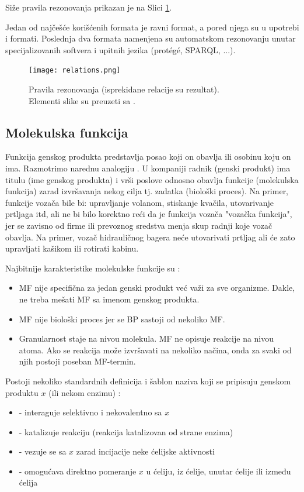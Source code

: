 Siže pravila rezonovanja prikazan je na Slici \ref{fig:relations}.

Jedan od najčešće korišćenih formata je  ravni  format, a pored njega
su u upotrebi  i  formati.  Poslednja dva formata
namenjena su automatskom rezonovanju unutar specijalizovanih softvera i upitnih
jezika (protégé, SPARQL, ...).

\begin{figure}[h!]
  \centering
  \texttt{[image: relations.png]}
  \caption{Pravila rezonovanja (isprekidane relacije su rezultat). \\ Elementi slike su preuzeti sa \parencite{go_veb}.}
  \label{fig:relations}
\end{figure}


\subsection{Molekulska funkcija}
\label{MF}

Funkcija genskog produkta predstavlja posao koji on obavlja ili osobinu koju on ima.
Razmotrimo narednu analogiju \parencite{go_mf}.  U kompaniji radnik (genski produkt) ima titulu
(ime genskog produkta) i vrši poslove odnosno obavlja funkcije (molekulska
funkcija) zarad izvršavanja nekog cilja tj. zadatka (biološki proces). Na
primer, funkcije vozača bile bi: upravljanje volanom, stiskanje kvačila,
utovarivanje prtljaga itd, ali ne bi bilo korektno reći da je funkcija vozača
"vozačka funkcija", jer se zavisno od firme ili prevoznog sredstva menja skup
radnji koje vozač obavlja. Na primer, vozač hidrauličnog bagera neće
utovarivati prtljag ali će zato upravljati kašikom ili rotirati kabinu.

Najbitnije karakteristike molekulske funkcije su \parencite{go_mf}:
\begin{itemize}
  \item MF nije specifična za jedan genski produkt već važi za sve organizme. Dakle, ne treba mešati MF sa imenom genskog produkta.
  \item MF nije biološki proces jer se BP sastoji od nekoliko MF.
  \item Granularnost staje na nivou molekula. MF ne opisuje reakcije na nivou
    atoma. Ako se reakcija može izvršavati na nekoliko načina, onda za svaki od njih
    postoji poseban MF-termin.
\end{itemize}

Postoji nekoliko standardnih definicija i šablon naziva koji se pripisuju genskom
produktu $x$ (ili nekom enzimu) \parencite{go_mf}:
\begin{itemize}
  \item {} - interaguje selektivno i nekovalentno sa $x$
  \item {} - katalizuje reakciju (reakcija katalizovan od strane enzima)
  \item {} - vezuje se sa $x$ zarad incijacije neke ćelijske aktivnosti
  \item {} - omogućava direktno pomeranje $x$ u ćeliju, iz ćelije, unutar ćelije ili između ćelija
\end{itemize}


